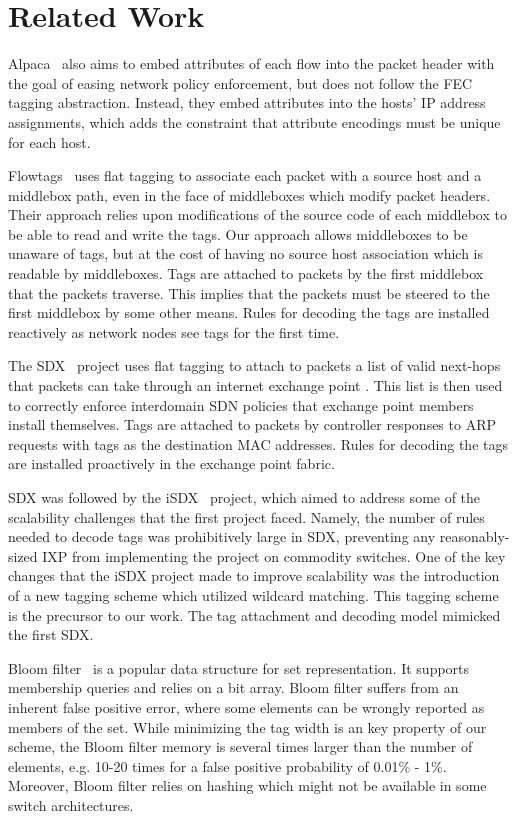 \section{Related Work} \label{sec:related}
Alpaca~\cite{alpaca} also aims to embed attributes of each flow into the packet header with the goal of easing network policy enforcement, but does not follow the FEC tagging abstraction. Instead, they embed attributes into the hosts' IP address assignments, which adds the constraint that attribute encodings must be unique for each host. 

Flowtags~\cite{flowtags} uses flat tagging to associate each packet with a source host and a middlebox path, even in the face of middleboxes which modify packet headers. Their approach relies upon modifications of the source code of each middlebox to be able to read and write the tags. Our approach allows middleboxes to be unaware of tags, but at the cost of having no source host association which is readable by middleboxes. Tags are attached to packets by the first middlebox that the packets traverse. This implies that the packets must be steered to the first middlebox by some other means. Rules for decoding the tags are installed reactively as network nodes see tags for the first time. 

The SDX~\cite{sdx} project uses flat tagging to attach to packets a list of valid next-hops that packets can take through an internet exchange point . This list is then used to correctly enforce interdomain SDN policies that exchange point members install themselves. Tags are attached to packets by controller responses to ARP requests with tags as the destination MAC addresses. Rules for decoding the tags are installed proactively in the exchange point fabric.

SDX was followed by the iSDX~\cite{isdx} project, which aimed to address some of the scalability challenges that the first project faced. Namely, the number of rules needed to decode tags was prohibitively large in SDX, preventing any reasonably-sized IXP from implementing the project on commodity switches. One of the key changes that the iSDX project made to improve scalability was the introduction of a new tagging scheme which utilized wildcard matching. This tagging scheme is the precursor to our work. The tag attachment and decoding model mimicked the first SDX.

Bloom filter~\cite{Bloom} is a popular data structure for set representation. It supports membership queries and relies on a bit array. Bloom filter suffers from an inherent false positive error, where some elements can be wrongly reported as members of the set. While minimizing the tag width is an key property of our scheme, the Bloom filter memory is several times larger than the number of elements, e.g. 10-20 times for a false positive probability of 0.01\% - 1\%. Moreover, Bloom filter relies on hashing which might not be available in some switch architectures.